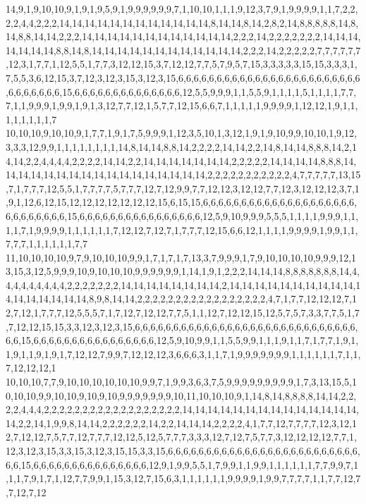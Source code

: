 14,9,1,9,10,10,9,1,9,1,9,5,9,1,9,9,9,9,9,9,7,1,10,10,1,1,1,9,12,3,7,9,1,9,9,9,9,1,1,7,2,2,2,2,4,4,2,2,2,14,14,14,14,14,14,14,14,14,14,14,14,8,14,14,8,14,2,8,2,14,8,8,8,8,8,14,8,14,8,8,14,14,2,2,2,14,14,14,14,14,14,14,14,14,14,14,14,2,2,2,14,2,2,2,2,2,2,2,14,14,14,14,14,14,14,8,8,14,8,14,14,14,14,14,14,14,14,14,14,14,14,2,2,2,14,2,2,2,2,2,7,7,7,7,7,7,12,3,1,7,7,1,12,5,5,1,7,7,3,12,12,15,3,7,12,12,7,7,5,7,9,5,7,15,3,3,3,3,3,15,15,3,3,3,1,7,5,5,3,6,12,15,3,7,12,3,12,3,15,3,12,3,15,6,6,6,6,6,6,6,6,6,6,6,6,6,6,6,6,6,6,6,6,6,6,6,6,6,6,6,6,6,6,6,15,6,6,6,6,6,6,6,6,6,6,6,6,6,6,12,5,5,9,9,9,1,1,5,5,9,1,1,1,1,5,1,1,1,1,7,7,7,1,1,9,9,9,1,9,9,1,9,1,3,12,7,7,12,1,5,7,7,12,15,6,6,7,1,1,1,1,1,9,9,9,9,1,12,12,1,9,1,1,1,1,1,1,1,1,7
10,10,10,9,10,10,9,1,7,7,1,9,1,7,5,9,9,9,1,12,3,5,10,1,3,12,1,9,1,9,10,9,9,10,10,1,9,12,3,3,3,12,9,9,1,1,1,1,1,1,1,1,14,8,14,14,8,8,14,2,2,2,2,14,14,2,2,14,8,14,14,8,8,8,14,2,14,14,2,2,4,4,4,4,2,2,2,2,14,14,2,2,14,14,14,14,14,14,14,2,2,2,2,2,14,14,14,14,8,8,8,14,14,14,14,14,14,14,14,14,14,14,14,14,14,14,14,14,2,2,2,2,2,2,2,2,2,2,2,4,7,7,7,7,7,13,15,7,1,7,7,7,12,5,5,1,7,7,7,7,5,7,7,7,12,7,12,9,9,7,7,12,12,3,12,12,7,7,12,3,12,12,12,3,7,1,9,1,12,6,12,15,12,12,12,12,12,12,12,15,6,15,15,6,6,6,6,6,6,6,6,6,6,6,6,6,6,6,6,6,6,6,6,6,6,6,6,6,6,6,6,15,6,6,6,6,6,6,6,6,6,6,6,6,6,6,6,6,12,5,9,10,9,9,9,5,5,5,1,1,1,1,9,9,9,1,1,1,1,7,1,9,9,9,9,1,1,1,1,1,1,7,12,12,7,12,7,1,7,7,7,12,15,6,6,12,1,1,1,1,9,9,9,9,1,9,9,1,1,7,7,7,1,1,1,1,1,1,7,7
11,10,10,10,10,9,7,9,10,10,10,9,9,1,7,1,7,1,7,13,3,7,9,9,9,1,7,9,10,10,10,10,9,9,9,12,13,15,3,12,5,9,9,9,10,9,10,10,10,9,9,9,9,9,9,1,14,1,9,1,2,2,2,14,14,14,8,8,8,8,8,8,8,14,4,4,4,4,4,4,4,4,4,2,2,2,2,2,2,2,14,14,14,14,14,14,14,14,2,14,14,14,14,14,14,14,14,14,14,14,14,14,14,14,14,14,8,9,8,14,14,2,2,2,2,2,2,2,2,2,2,2,2,2,2,2,2,2,4,7,1,7,7,12,12,12,7,12,7,12,1,7,7,7,12,5,5,5,7,1,7,12,7,12,12,7,7,5,1,1,12,7,12,12,15,12,5,7,5,7,3,3,7,7,5,1,7,7,12,12,15,15,3,3,12,3,12,3,15,6,6,6,6,6,6,6,6,6,6,6,6,6,6,6,6,6,6,6,6,6,6,6,6,6,6,6,6,6,6,6,15,6,6,6,6,6,6,6,6,6,6,6,6,6,6,6,6,12,5,9,10,9,9,1,1,5,5,9,9,1,1,1,9,1,1,7,1,7,7,1,9,1,1,9,1,1,9,1,9,1,7,12,12,7,9,9,7,12,12,12,3,6,6,6,3,1,1,7,1,9,9,9,9,9,9,9,1,1,1,1,1,1,7,1,1,7,12,12,12,1
10,10,10,7,7,9,10,10,10,10,10,10,9,9,7,1,9,9,3,6,3,7,5,9,9,9,9,9,9,9,9,9,1,7,3,13,15,5,10,10,10,9,9,10,10,9,10,9,10,9,9,9,9,9,9,9,10,11,10,10,10,9,1,14,8,14,8,8,8,8,14,14,2,2,2,2,4,4,4,2,2,2,2,2,2,2,2,2,2,2,2,2,2,2,2,2,2,14,14,14,14,14,14,14,14,14,14,14,14,14,14,14,2,2,14,1,9,9,8,14,14,2,2,2,2,2,2,14,2,2,14,14,14,2,2,2,2,4,1,7,7,12,7,7,7,7,12,3,12,12,7,12,12,7,5,7,7,12,7,7,7,12,12,5,12,5,7,7,7,3,3,3,12,7,12,7,5,7,7,3,12,12,12,12,7,7,1,12,3,12,3,15,3,3,15,3,12,3,15,15,3,3,15,6,6,6,6,6,6,6,6,6,6,6,6,6,6,6,6,6,6,6,6,6,6,6,6,6,6,6,15,6,6,6,6,6,6,6,6,6,6,6,6,6,6,6,12,9,1,9,9,5,5,1,7,9,9,1,1,9,9,1,1,1,1,1,1,7,7,9,9,7,1,1,1,7,9,1,7,1,12,7,7,9,9,1,15,3,12,7,15,6,3,1,1,1,1,1,1,9,9,9,9,1,9,9,7,7,7,7,1,1,7,7,12,7,7,12,7,12

